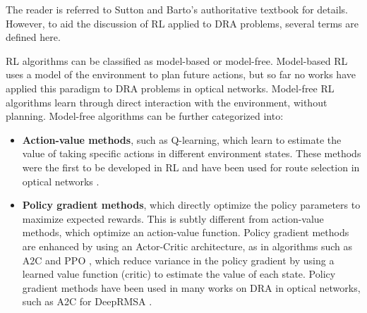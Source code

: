 The reader is referred to Sutton and Barto's authoritative textbook \cite{sutton_reinforcement_2018} for details. However, to aid the discussion of RL applied to DRA problems, several terms are defined here.

RL algorithms can be classified as model-based or model-free. Model-based RL uses a model of the environment to plan future actions, but so far no works have applied this paradigm to DRA problems in optical networks. Model-free RL algorithms learn through direct interaction with the environment, without planning. Model-free algorithms can be further categorized into:
\begin{itemize}
\item \textbf{Action-value methods}, such as Q-learning, which learn to estimate the value of taking specific actions in different environment states. These methods were the first to be developed in RL \cite{watkins_learning_1989,sutton_learning_1988} and have been used for route selection in optical networks \cite{bryant_q-learning_2022}.
\item \textbf{Policy gradient methods}, which directly optimize the policy parameters to maximize expected rewards. This is subtly different from action-value methods, which optimize an action-value function. Policy gradient methods are enhanced by using an Actor-Critic architecture, as in algorithms such as A2C \cite{mnih_asynchronous_2016} and PPO \cite{schulman_proximal_2017}, which reduce variance in the policy gradient by using a learned value function (critic) to estimate the value of each state. Policy gradient methods have been used in many works on DRA in optical networks, such as A2C for DeepRMSA \cite{chen_deeprmsa_2019}. 
\end{itemize}




